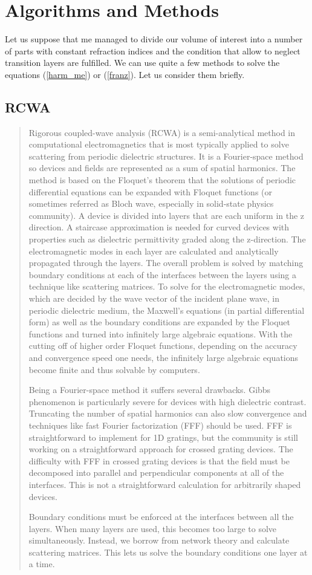 \documentclass[12pt]{article}
\begin{document}
\section{Algorithms and Methods}
Let us suppose that me managed to divide our volume of interest into a number of parts with constant refraction indices and the condition that allow to neglect transition layers are fulfilled. We can use quite a few methods to solve the equations (\ref{harm_me}) or (\ref{franz}). Let us consider them briefly.
\subsection{RCWA}
\begin{quotation}
Rigorous coupled-wave analysis (RCWA) is a semi-analytical method in computational electromagnetics that is most typically applied to solve scattering from periodic dielectric structures. It is a Fourier-space method so devices and fields are represented as a sum of spatial harmonics. The method is based on the Floquet's theorem that the solutions of periodic differential equations can be expanded with Floquet functions (or sometimes referred as Bloch wave, especially in solid-state physics community). A device is divided into layers that are each uniform in the z direction. A staircase approximation is needed for curved devices with properties such as dielectric permittivity graded along the z-direction. The electromagnetic modes in each layer are calculated and analytically propagated through the layers. The overall problem is solved by matching boundary conditions at each of the interfaces between the layers using a technique like scattering matrices. To solve for the electromagnetic modes, which are decided by the wave vector of the incident plane wave, in periodic dielectric medium, the Maxwell's equations (in partial differential form) as well as the boundary conditions are expanded by the Floquet functions and turned into infinitely large algebraic equations. With the cutting off of higher order Floquet functions, depending on the accuracy and convergence speed one needs, the infinitely large algebraic equations become finite and thus solvable by computers.

Being a Fourier-space method it suffers several drawbacks. Gibbs phenomenon is particularly severe for devices with high dielectric contrast. Truncating the number of spatial harmonics can also slow convergence and techniques like fast Fourier factorization (FFF) should be used. FFF is straightforward to implement for 1D gratings, but the community is still working on a straightforward approach for crossed grating devices. The difficulty with FFF in crossed grating devices is that the field must be decomposed into parallel and perpendicular components at all of the interfaces. This is not a straightforward calculation for arbitrarily shaped devices.

Boundary conditions must be enforced at the interfaces between all the layers. When many layers are used, this becomes too large to solve simultaneously. Instead, we borrow from network theory and calculate scattering matrices. This lets us solve the boundary conditions one layer at a time. 
\end{quotation}
\end{document}
